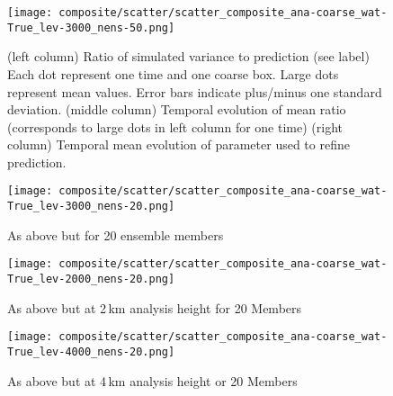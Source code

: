 \documentclass[a4paper, 12pt]{article}
\begin{document}
\begin{figure}[ht]
\noindent \centering
\texttt{[image: composite/scatter/scatter\_composite\_ana-coarse\_wat-True\_lev-3000\_nens-50.png]}\\
\caption{(left column) Ratio of simulated variance to prediction (see label) Each dot represent one time and one coarse box. Large dots represent mean values. Error bars indicate plus/minus one standard deviation. (middle column) Temporal evolution of mean ratio (corresponds to large dots in left column for one time) (right column) Temporal mean evolution of parameter used to refine prediction.} \label{fig:scatter}
\end{figure}

\begin{figure}[ht]
\noindent \centering
\texttt{[image: composite/scatter/scatter\_composite\_ana-coarse\_wat-True\_lev-3000\_nens-20.png]}\\
\caption{As above but for 20 ensemble members} \label{fig:scatter_20mem}
\end{figure}

\begin{figure}[ht]
\noindent \centering
\texttt{[image: composite/scatter/scatter\_composite\_ana-coarse\_wat-True\_lev-2000\_nens-20.png]}\\
\caption{As above but at 2\,km analysis height for 20 Members} \label{fig:scatter_2000}
\end{figure}

\begin{figure}[ht]
\noindent \centering
\texttt{[image: composite/scatter/scatter\_composite\_ana-coarse\_wat-True\_lev-4000\_nens-20.png]}\\
\caption{As above but at 4\,km analysis height or 20 Members} \label{fig:scatter_4000}
\end{figure}
\end{document}
